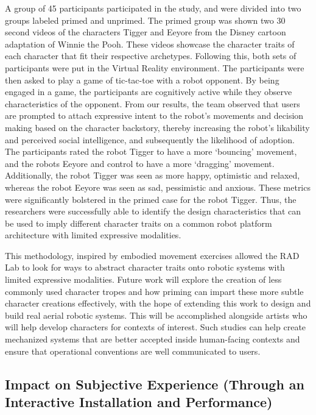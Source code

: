 \documentclass[arts,article,submit,moreauthors,pdftex,10pt,a4paper]{mdpi}
\begin{document}
A group of 45 participants participated in the study, and were divided into two groups labeled primed and unprimed. The primed group was shown two 30 second videos of the characters Tigger and Eeyore from the Disney cartoon adaptation of Winnie the Pooh. These videos showcase the character traits of each character that fit their respective archetypes. Following this, both sets of participants were put in the Virtual Reality environment. The participants were then asked to play a game of tic-tac-toe with a robot opponent. By being engaged in a game, the participants are cognitively active while they observe characteristics of the opponent. From our results, the team observed that users are prompted to attach expressive intent to the robot{'}s movements and decision making based on the character backstory, thereby increasing the robot's likability and perceived social intelligence, and subsequently the likelihood of adoption. The participants rated the robot Tigger to have a more {`}bouncing{'} movement, and the robots Eeyore and control to have a more {`}dragging{'} movement. Additionally, the robot Tigger was seen as more happy, optimistic and relaxed, whereas the robot Eeyore was seen as sad, pessimistic and anxious. These metrics were significantly bolstered in the primed case for the robot Tigger. Thus, the researchers were successfully able to identify the design characteristics that can be used to imply different character traits on a common robot platform architecture with limited expressive modalities.

This methodology, inspired by embodied movement exercises allowed the RAD Lab to look for ways to abstract character traits onto robotic systems with limited expressive modalities. Future work will explore the creation of less commonly used character tropes and how priming can impart these more subtle character creations effectively, with the hope of extending this work to design and build real aerial robotic systems. This will be accomplished alongside artists who will help develop characters for contexts of interest. Such studies can help create mechanized systems that are better accepted inside human-facing contexts and ensure that operational conventions are well communicated to users.

\subsection{Impact on Subjective Experience (Through an Interactive Installation and Performance)}
\end{document}
